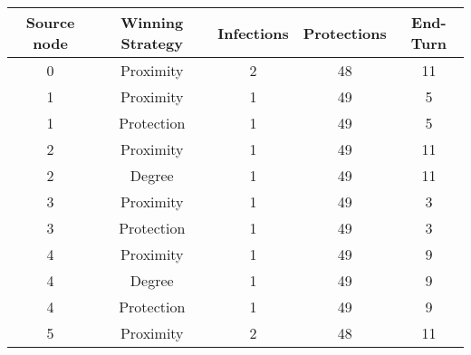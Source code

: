 \documentclass[results.tex]{subfiles}
\begin{document}
    \begin{center}
        \begin{tabular}{| c || c | c | c | c |}
            \hline
            {\bfseries Source node} & {\bfseries Winning Strategy} & {\bfseries Infections} & {\bfseries Protections}
            & {\bfseries End-Turn}
            \\  %
            \hline\hline
            0                       & Proximity                    & 2                      & 48                      & 11                   \\
            \hline
            1                       & Proximity                    & 1                      & 49                      & 5                    \\
            \hline
            1                       & Protection                   & 1                      & 49                      & 5                    \\
            \hline
            2                       & Proximity                    & 1                      & 49                      & 11                   \\
            \hline
            2                       & Degree                       & 1                      & 49                      & 11                   \\
            \hline
            3                       & Proximity                    & 1                      & 49                      & 3                    \\
            \hline
            3                       & Protection                   & 1                      & 49                      & 3                    \\
            \hline
            4                       & Proximity                    & 1                      & 49                      & 9                    \\
            \hline
            4                       & Degree                       & 1                      & 49                      & 9                    \\
            \hline
            4                       & Protection                   & 1                      & 49                      & 9                    \\
            \hline
            5                       & Proximity                    & 2                      & 48                      & 11                   \\

\end{tabular}
\end{center}
\end{document}
